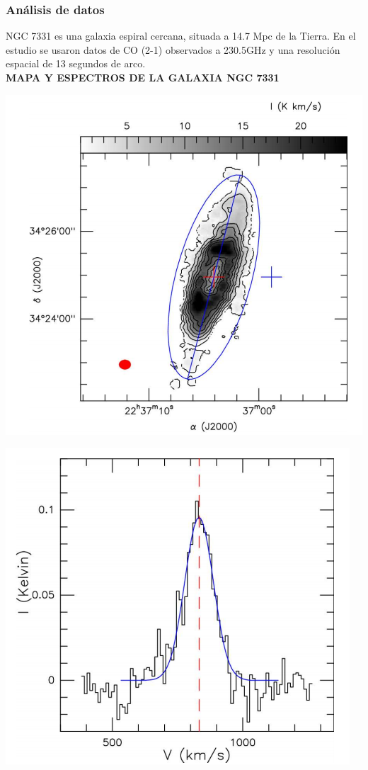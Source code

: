 \documentclass[8pt]{beamer}
\begin{document}
\begin{frame}
\frametitle{Análisis de datos}
NGC 7331 es una galaxia espiral cercana, situada a 14.7 Mpc de la Tierra. En el estudio se usaron datos de CO (2-1) observados a  230.5GHz y una resolución espacial de 13 segundos de arco. \\
\textbf{ MAPA Y ESPECTROS DE LA GALAXIA NGC 7331 }\\
\begin{minipage}[t]{0.32\linewidth}
\includegraphics[width=0.9\linewidth]{figures/ngc7331_1.png}
\end{minipage}
\begin{minipage}[t]{0.32\linewidth}
\includegraphics[width=0.8\linewidth]{figures/ngc2.png}

\end{minipage}
\end{frame}
\end{document}
